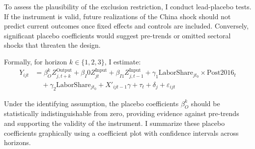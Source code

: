 ﻿\documentclass[12pt]{article}
\begin{document}
To assess the plausibility of the exclusion restriction, I conduct lead-placebo tests. If the instrument is valid, future realizations of the China shock should not predict current outcomes once fixed effects and controls are included. Conversely, significant placebo coefficients would suggest pre-trends or omitted sectoral shocks that threaten the design.

Formally, for horizon $k \in \{1,2,3\}$, I estimate:
\begin{equation}
\begin{aligned}
Y_{ijt} &= \beta^{k}_O Z^{\text{Output}}_{j,t+k} + \beta_I0 Z_{jt}^{\text{Input}} + \beta_{I1} Z_{j,t-1}^{\text{Input}} + \gamma_1 \text{LaborShare}_{jt_0} \times \text{Post2016}_t \\
&\quad + \gamma_2 \text{LaborShare}_{jt_0} + X'_{ijt-1} \gamma + \tau_t + \delta_j + \varepsilon_{ijt}
\end{aligned}
\end{equation}

Under the identifying assumption, the placebo coefficients $\beta^{k}_O$ should be statistically indistinguishable from zero, providing evidence against pre-trends and supporting the validity of the instrument. I summarize these placebo coefficients graphically using a coefficient plot with confidence intervals across horizons.
\end{document}
